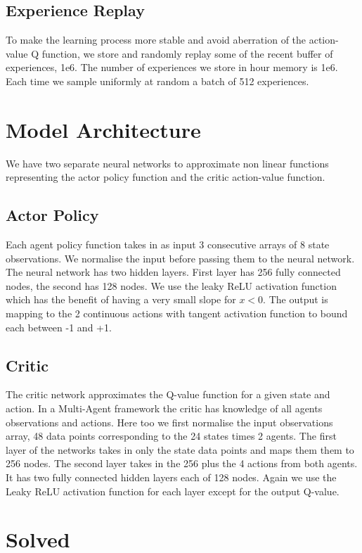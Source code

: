 \documentclass[pagenumber=off]{article}
\begin{document}
\subsection{Experience Replay}
To make the learning process more stable and avoid aberration of the action-value Q function, we store and randomly replay some of the recent buffer of experiences, 1e6.
The number of experiences we store in hour memory is 1e6. Each time we sample uniformly at random a batch of 512 experiences.


\section{Model Architecture}

We have two separate neural networks to approximate non linear functions representing the actor policy function and the critic action-value function. 

\subsection{Actor Policy}
Each agent policy function takes in as input 3 consecutive arrays of 8 state observations.
We normalise the input before passing them to the neural network.
The neural network has two hidden layers. First layer has 256 fully connected nodes, the second has 128 nodes.
We use the leaky ReLU activation function which has the benefit of having a very small slope for $x < 0$.
The output is mapping to the 2 continuous actions with tangent activation function to bound each between -1 and +1.

\subsection{Critic}
The critic network approximates the Q-value function for a given state and action. In a Multi-Agent framework the critic has knowledge of all agents observations and actions.
Here too we first normalise the input observations array, 48 data points corresponding to the 24 states times 2 agents.
The first layer of the networks takes in only the state data points and maps them them to 256 nodes.
The second layer takes in the 256 plus the 4 actions from both agents. It has two fully connected hidden layers each of 128 nodes.
Again we use the Leaky ReLU activation function for each layer except for the output Q-value.


\newpage
\section{Solved}
\end{document}
